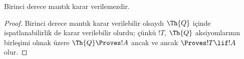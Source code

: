 \begin{cor}
Birinci derece mantık karar verilemezdir.
\end{cor}

\begin{proof}
Birinci derece mantık karar verilebilir olsaydı $\Th{Q}$ içinde
ispatlanabilirlik de karar verilebilir olurdu; çünkü $!T$, $\Th{Q}$
aksiyomlarının birleşimi olmak üzere $\Th{Q} \Proves !A$ ancak ve ancak
$\Proves !T \lif !A$ olur.
\end{proof}

